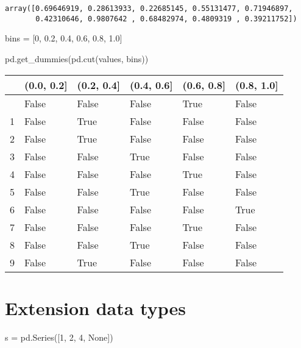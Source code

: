 \documentclass[
  letterpaper,
  DIV=11,
  numbers=noendperiod]{scrreprt}
\newenvironment{Shaded}{\begin{snugshade}}{\end{snugshade}}
\newcommand{\DecValTok}[1]{\textcolor[rgb]{0.68,0.00,0.00}{#1}}
\newcommand{\FloatTok}[1]{\textcolor[rgb]{0.68,0.00,0.00}{#1}}
\newcommand{\NormalTok}[1]{\textcolor[rgb]{0.00,0.23,0.31}{#1}}
\newcommand{\OperatorTok}[1]{\textcolor[rgb]{0.37,0.37,0.37}{#1}}
\newcommand{\VariableTok}[1]{\textcolor[rgb]{0.07,0.07,0.07}{#1}}
\begin{document}
\begin{verbatim}
array([0.69646919, 0.28613933, 0.22685145, 0.55131477, 0.71946897,
       0.42310646, 0.9807642 , 0.68482974, 0.4809319 , 0.39211752])
\end{verbatim}

\begin{Shaded}
\begin{Highlighting}[]
\NormalTok{bins }\OperatorTok{=}\NormalTok{ [}\DecValTok{0}\NormalTok{, }\FloatTok{0.2}\NormalTok{, }\FloatTok{0.4}\NormalTok{, }\FloatTok{0.6}\NormalTok{, }\FloatTok{0.8}\NormalTok{, }\FloatTok{1.0}\NormalTok{]}

\NormalTok{pd.get\_dummies(pd.cut(values, bins))}
\end{Highlighting}
\end{Shaded}

\begin{longtable}[]{@{}llllll@{}}
\toprule\noalign{}
& (0.0, 0.2{]} & (0.2, 0.4{]} & (0.4, 0.6{]} & (0.6, 0.8{]} & (0.8,
1.0{]} \\
\midrule\noalign{}
\endhead
\bottomrule\noalign{}
\endlastfoot
0 & False & False & False & True & False \\
1 & False & True & False & False & False \\
2 & False & True & False & False & False \\
3 & False & False & True & False & False \\
4 & False & False & False & True & False \\
5 & False & False & True & False & False \\
6 & False & False & False & False & True \\
7 & False & False & False & True & False \\
8 & False & False & True & False & False \\
9 & False & True & False & False & False \\
\end{longtable}

\hypertarget{extension-data-types-1}{%
\section{Extension data types}\label{extension-data-types-1}}

\begin{Shaded}
\begin{Highlighting}[]
\NormalTok{s }\OperatorTok{=}\NormalTok{ pd.Series([}\DecValTok{1}\NormalTok{, }\DecValTok{2}\NormalTok{, }\DecValTok{4}\NormalTok{, }\VariableTok{None}\NormalTok{])}
\end{Highlighting}
\end{Shaded}
\end{document}
